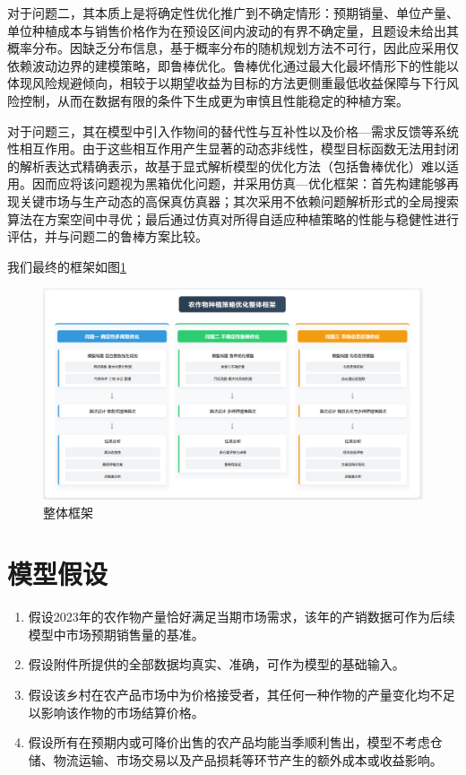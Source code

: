 对于问题二，其本质上是将确定性优化推广到不确定情形：预期销量、单位产量、单位种植成本与销售价格作为在预设区间内波动的有界不确定量，且题设未给出其概率分布。因缺乏分布信息，基于概率分布的随机规划方法不可行，因此应采用仅依赖波动边界的建模策略，即鲁棒优化。鲁棒优化通过最大化最坏情形下的性能以体现风险规避倾向，相较于以期望收益为目标的方法更侧重最低收益保障与下行风险控制，从而在数据有限的条件下生成更为审慎且性能稳定的种植方案。

对于问题三，其在模型中引入作物间的替代性与互补性以及价格—需求反馈等系统性相互作用。由于这些相互作用产生显著的动态非线性，模型目标函数无法用封闭的解析表达式精确表示，故基于显式解析模型的优化方法（包括鲁棒优化）难以适用。因而应将该问题视为黑箱优化问题，并采用仿真—优化框架：首先构建能够再现关键市场与生产动态的高保真仿真器；其次采用不依赖问题解析形式的全局搜索算法在方案空间中寻优；最后通过仿真对所得自适应种植策略的性能与稳健性进行评估，并与问题二的鲁棒方案比较。

我们最终的框架如图\ref{fig:all}

\begin{figure}[htbp]
	\centering
	\includegraphics[width=\textwidth]{figs/1前置/全文框架.png}
	\caption{整体框架}
	\label{fig:all}
\end{figure}


\section{模型假设}

\begin{enumerate}
	\item 假设2023年的农作物产量恰好满足当期市场需求，该年的产销数据可作为后续模型中市场预期销售量的基准。
	\item 假设附件所提供的全部数据均真实、准确，可作为模型的基础输入。
	\item 假设该乡村在农产品市场中为价格接受者，其任何一种作物的产量变化均不足以影响该作物的市场结算价格。
	\item 假设所有在预期内或可降价出售的农产品均能当季顺利售出，模型不考虑仓储、物流运输、市场交易以及产品损耗等环节产生的额外成本或收益影响。
\end{enumerate}



